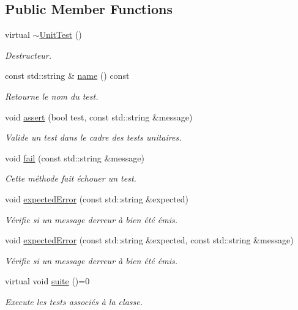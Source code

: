 \subsection*{Public Member Functions}
\begin{DoxyCompactItemize}
\item 
\mbox{\label{classUnitTest_a5a57054084ce200e1e92ff3eecc8420a}} 
virtual \hyperlink{classUnitTest_a5a57054084ce200e1e92ff3eecc8420a}{$\sim$\+Unit\+Test} ()
\begin{DoxyCompactList}\small\item\em Destructeur. \end{DoxyCompactList}\item 
const std\+::string \& \hyperlink{classUnitTest_a6582f12faa929906359112ac916263ea}{name} () const
\begin{DoxyCompactList}\small\item\em Retourne le nom du test. \end{DoxyCompactList}\item 
void \hyperlink{classUnitTest_a94aab90579073ba6e2068bbc05c47c4a}{assert} (bool test, const std\+::string \&message)
\begin{DoxyCompactList}\small\item\em Valide un test dans le cadre des tests unitaires. \end{DoxyCompactList}\item 
void \hyperlink{classUnitTest_aae657d6d8bdc56cb2a9d4e4e9f5f8929}{fail} (const std\+::string \&message)
\begin{DoxyCompactList}\small\item\em Cette méthode fait échouer un test. \end{DoxyCompactList}\item 
void \hyperlink{classUnitTest_a734b8df5cd0686245f9ce9ccbb73c5ee}{expected\+Error} (const std\+::string \&expected)
\begin{DoxyCompactList}\small\item\em Vérifie si un message d\textquotesingle{}erreur à bien été émis. \end{DoxyCompactList}\item 
void \hyperlink{classUnitTest_a00a74363b89994348f5025b42f7ea96f}{expected\+Error} (const std\+::string \&expected, const std\+::string \&message)
\begin{DoxyCompactList}\small\item\em Vérifie si un message d\textquotesingle{}erreur à bien été émis. \end{DoxyCompactList}\item 
\mbox{\label{classUnitTest_a15eae3e23414a5877c8652655dd88c3f}} 
virtual void \hyperlink{classUnitTest_a15eae3e23414a5877c8652655dd88c3f}{suite} ()=0
\begin{DoxyCompactList}\small\item\em Execute les tests associés à la classe. \end{DoxyCompactList}\end{DoxyCompactItemize}
